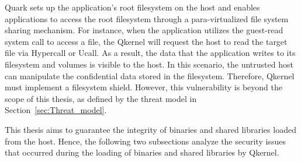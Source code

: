 Quark sets up the application's root filesystem on the host and enables applications to access the root filesystem through a para-virtualized file system sharing mechanism. For instance, when the application utilizes the guest-read system call to access a file, the Qkernel will request the host to read the target file via Hypercall or Ucall. As a result, the 
data that the application writes to its filesystem and volumes is visible to the host. In this scenario, the untrusted host can manipulate the confidential data stored in the filesystem. Therefore, Qkernel must implement a filesystem shield. However, this vulnerability is beyond the scope of this thesis, as defined by the threat model in 
Section~\ref{sec:Threat_model}.

This thesis aims to guarantee the integrity of binaries and shared libraries loaded from the host. Hence, the following two subsections analyze the security issues that occurred during the loading of binaries and shared libraries by Qkernel.

